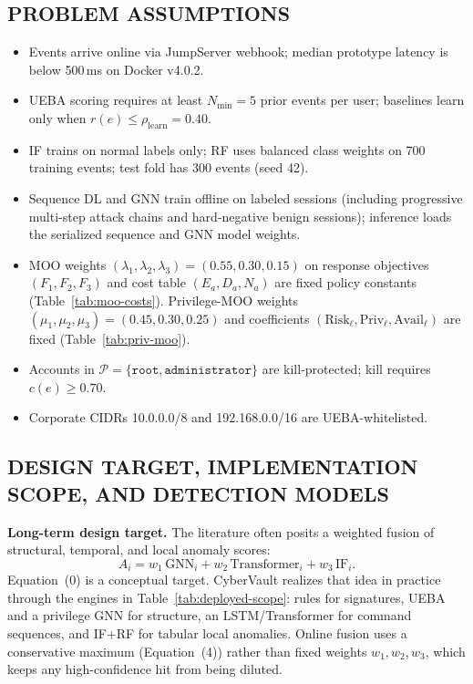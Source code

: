 \documentclass{ieeeaccess}
\begin{document}
\subsection{PROBLEM ASSUMPTIONS}
\begin{itemize}
\item Events arrive online via JumpServer webhook; median prototype latency is below 500\,ms on Docker v4.0.2.
\item UEBA scoring requires at least $N_{\min}=5$ prior events per user; baselines learn only when $r(e)\leq\rho_{\mathrm{learn}}=0.40$.
\item IF trains on normal labels only; RF uses balanced class weights on 700 training events; test fold has 300 events (seed 42).
\item Sequence DL and GNN train offline on labeled sessions (including progressive multi-step attack chains and hard-negative benign sessions); inference loads the serialized sequence and GNN model weights.
\item MOO weights $(\lambda_1,\lambda_2,\lambda_3)=(0.55,0.30,0.15)$ on response objectives $(F_1,F_2,F_3)$ and cost table $(E_a,D_a,N_a)$ are fixed policy constants (Table~\ref{tab:moo-costs}). Privilege-MOO weights $(\mu_1,\mu_2,\mu_3)=(0.45,0.30,0.25)$ and coefficients $(\mathrm{Risk}_{\ell},\mathrm{Priv}_{\ell},\mathrm{Avail}_{\ell})$ are fixed (Table~\ref{tab:priv-moo}).
\item Accounts in $\mathcal{P}=\{\texttt{root},\texttt{administrator}\}$ are kill-protected; kill requires $c(e)\geq 0.70$.
\item Corporate CIDRs 10.0.0.0/8 and 192.168.0.0/16 are UEBA-whitelisted.
\end{itemize}


\subsection{DESIGN TARGET, IMPLEMENTATION SCOPE, AND DETECTION MODELS}

\textbf{Long-term design target.} The literature often posits a weighted fusion of structural, temporal, and local anomaly scores:
\begin{equation}
A_i = w_1\,\mathrm{GNN}_i + w_2\,\mathrm{Transformer}_i + w_3\,\mathrm{IF}_i.
\tag{0}
\end{equation}
Equation~(0) is a conceptual target. CyberVault realizes that idea in practice through the engines in Table~\ref{tab:deployed-scope}: rules for signatures, UEBA and a privilege GNN for structure, an LSTM/Transformer for command sequences, and IF+RF for tabular local anomalies. Online fusion uses a conservative maximum (Equation~(4)) rather than fixed weights $w_1,w_2,w_3$, which keeps any high-confidence hit from being diluted.
\end{document}
